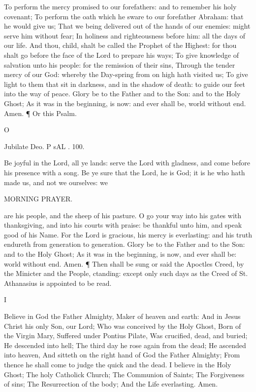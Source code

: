 To perform the mercy promised to our forefathers: and to remember his holy covenant; To perform the oath which he sware to our forefather Abraham: that he would give us; That we being delivered out of the hands of our enemies: might serve him without fear; In holiness and righteousness before him: all the days of our life. And thou, child, shalt be called the Prophet of the Highest: for thou shalt go before the face of the Lord to prepare his ways; To give knowledge of salvation unto his people: for the remission of their sins, Through the tender mercy of our God: whereby the Day-spring from on high hath visited us; To give light to them that sit in darkness, and in the shadow of death: to guide our feet into the way of peace. Glory be to the Father and to the Son: and to the Holy Ghost; As it was in the beginning, is now: and ever shall be, world without end. Amen. ¶ Or this Psalm.

O

Jubilate Deo. P sAL . 100.

Be joyful in the Lord, all ye lands: serve the Lord with gladness, and come before his presence with a song. Be ye sure that the Lord, he is God; it is he who hath made us, and not we ourselves: we

MORNING PRAYER.

are his people, and the sheep of his pasture. O go your way into his gates with thanksgiving, and into his courts with praise: be thankful unto him, and speak good of his Name. For the Lord is gracious, his mercy is everlasting: and his truth endureth from generation to generation. Glory be to the Father and to the Son: and to the Holy Ghost; As it was in the beginning, is now, and ever shall be: world without end. Amen. ¶ Then shall be sung or said the Apoctles Creed, by the Minicter and the People, ctanding: except only such days as the Creed of St. Athanasius is appointed to be read.

I

Believe in God the Father Almighty, Maker of heaven and earth: And in Jesus Christ his only Son, our Lord; Who was conceived by the Holy Ghost, Born of the Virgin Mary, Suffered under Pontius Pilate, Was crucified, dead, and buried; He descended into hell; The third day he rose again from the dead; He ascended into heaven, And sitteth on the right hand of God the Father Almighty; From thence he shall come to judge the quick and the dead. I believe in the Holy Ghost; The holy Catholick Church; The Communion of Saints; The Forgiveness of sins; The Resurrection of the body; And the Life everlasting. Amen.


